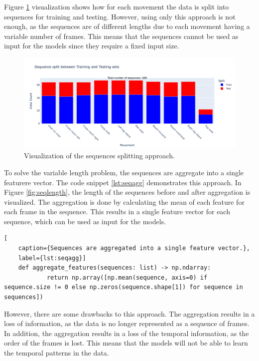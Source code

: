             Figure \ref{fig:seqsplit} visualization shows how for each movement the data is split into sequences for training and testing. However, using only this approach is not enough, as the sequences are of different lengths due to each movement having a variable number of frames. This means that the sequences cannot be used as input for the models since they require a fixed input size. 
        
            \begin{figure}[H]
            \centering
            \includegraphics[width=1.0\textwidth]{../src/resources/seq_split.png}
            \caption{
                Visualization of the sequences splitting approach.
            }
            \label{fig:seqsplit}
        \end{figure}

        \newpage 

        To solve the variable length problem, the sequences are aggregate into a single featurere vector. The code snippet \ref{lst:seqagg} demonstrates this approach. In Figure \ref{fig:seqlength}, the length of the sequences before and after aggregation is visualized. The aggregation is done by calculating the mean of each feature for each frame in the sequence. This results in a single feature vector for each sequence, which can be used as input for the models.

\begin{lstlisting}[
    caption={Sequences are aggregated into a single feature vector.}, 
    label={lst:seqagg}]                
    def aggregate_features(sequences: list) -> np.ndarray:
            return np.array([np.mean(sequence, axis=0) if sequence.size != 0 else np.zeros(sequence.shape[1]) for sequence in sequences])
\end{lstlisting}
        
However, there are some drawbacks to this approach. The aggregation results in a loss of information, as the data is no longer represented as a sequence of frames. In addition, the aggregation results in a loss of the temporal information, as the order of the frames is lost. This means that the models will not be able to learn the temporal patterns in the data.

